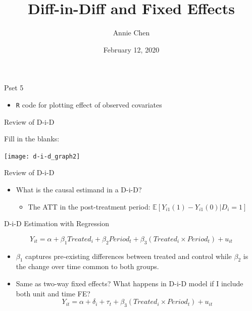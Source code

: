 \documentclass[ignorenonframetext,]{beamer}
\title{Diff-in-Diff and Fixed Effects}
\author{Annie Chen}
\date{February 12, 2020}
\providecommand{\tightlist}{%
  \setlength{\itemsep}{0pt}\setlength{\parskip}{0pt}}
\begin{document}
\frame{\titlepage}

\begin{frame}[fragile]{Pset 5}

\begin{itemize}[<+->]
\tightlist
\item
  \texttt{R} code for plotting effect of observed covariates
\end{itemize}

\end{frame}

\begin{frame}{Review of D-i-D}

Fill in the blanks:

\begin{center}\texttt{[image: d-i-d\_graph2]} \end{center}

\end{frame}

\begin{frame}{Review of D-i-D}

\begin{itemize}[<+->]
\tightlist
\item
  What is the causal estimand in a D-i-D?

  \begin{itemize}[<+->]
  \tightlist
  \item
    The ATT in the post-treatment period:
    \(\mathbb{E}[Y_{i1}(1) - Y_{i1}(0) | D_i = 1]\)
  \end{itemize}
\end{itemize}

\end{frame}

\begin{frame}{D-i-D Estimation with Regression}

\[Y_{it} = \alpha + \beta_1Treated_{i} + \beta_2Period_{t} + \beta_3(Treated_i \times Period_t) + u_{it}\]

\begin{itemize}[<+->]
\item
  \(\beta_1\) captures pre-existing differences between treated and
  control while \(\beta_2\) is the change over time common to both
  groups.
\item
  Same as two-way fixed effects? What happens in D-i-D model if I
  include both unit and time FE?
  \[Y_{it} = \alpha + \delta_i + \tau_t + \beta_3(Treated_{i} \times Period_{t}) + u_{it}\]
\end{itemize}

\end{frame}
\end{document}
